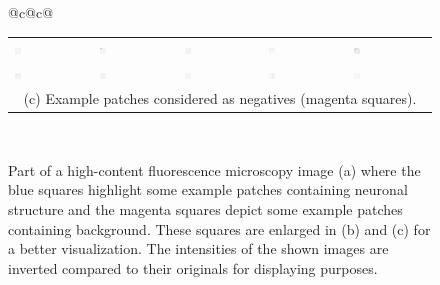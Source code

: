 \begin{figure}
\begin{tabular}{@{}c@{\hspace{0.05\textwidth}}c@{}}
\begin{tabular}{@{}p{}@{}p{}@{}p{}@{}p{}@{}p{}@{}}
			\includegraphics[width=0.085\textwidth]{fig01c06} &
			\includegraphics[width=0.085\textwidth]{fig01c07} &
			\includegraphics[width=0.085\textwidth]{fig01c08} &
			\includegraphics[width=0.085\textwidth]{fig01c09} &
			\includegraphics[width=0.085\textwidth]{fig01c10} \\
			\includegraphics[width=0.085\textwidth]{fig01c11} &
			\includegraphics[width=0.085\textwidth]{fig01c12} &
			\includegraphics[width=0.085\textwidth]{fig01c13} &
			\includegraphics[width=0.085\textwidth]{fig01c14} &
			\includegraphics[width=0.085\textwidth]{fig01c15} \\[1ex]
			\multicolumn{5}{c}{(c) Example patches considered as negatives (magenta squares).} \\
		\end{tabular} \\
	\end{tabular}
	\caption{Part of a high-content fluorescence microscopy image (a) where the blue squares highlight some example patches containing neuronal structure and the magenta squares depict some example patches containing background. These squares are enlarged in (b) and (c) for a better visualization. The intensities of the shown images are inverted compared to their originals for displaying purposes.}
	\label{fig1}%
\end{figure}


